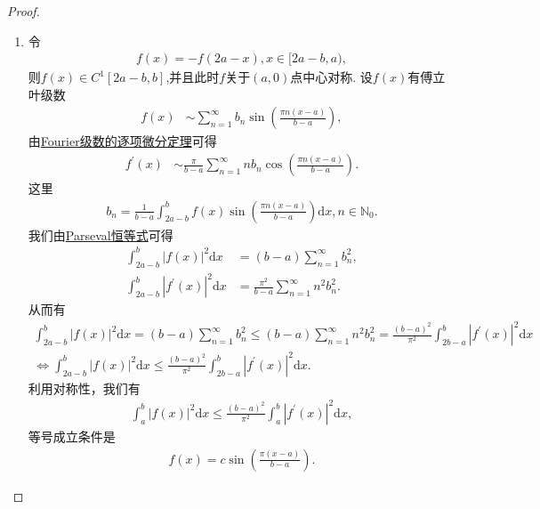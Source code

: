 \documentclass[../../main.tex]{subfiles}
\begin{document}
\begin{proof}
\begin{enumerate}[(1)]
\item 令
\begin{align*}
f(x)=-f(2a - x), x\in[2a - b,a),
\end{align*}
则$f(x)\in C^1[2a - b,b]$,并且此时$f$关于$(a,0)$点中心对称.
设$f(x)$有傅立叶级数
\begin{align*}
f(x) &\sim \sum_{n = 1}^{\infty}b_n\sin\left(\frac{\pi n(x - a)}{b - a}\right),
\end{align*}
由\hyperref[theorem:Fourier级数的逐项微分定理]{Fourier级数的逐项微分定理}可得
\begin{align*}
f^{\prime}(x) &\sim \frac{\pi}{b - a}\sum_{n = 1}^{\infty}nb_n\cos\left(\frac{\pi n(x - a)}{b - a}\right).
\end{align*}
这里
\begin{align*}
b_n=\frac{1}{b - a}\int_{2a - b}^{b}f(x)\sin\left(\frac{\pi n(x - a)}{b - a}\right)\mathrm{d}x, n\in\mathbb{N}_0.
\end{align*}
我们由\hyperref[theorem:Parseval恒等式]{Parseval恒等式}可得
\begin{align*}
\int_{2a - b}^{b}|f(x)|^2\mathrm{d}x&=(b - a)\sum_{n = 1}^{\infty}b_n^2,\\
\int_{2a - b}^{b}|f^{\prime}(x)|^2\mathrm{d}x&=\frac{\pi^2}{b - a}\sum_{n = 1}^{\infty}n^2b_n^2.
\end{align*}
从而有
\begin{gather*}
\int_{2a-b}^b{|f(x)|^2\mathrm{d}x}=\left( b-a \right) \sum_{n=1}^{\infty}{b_{n}^{2}}\leqslant \left( b-a \right) \sum_{n=1}^{\infty}{n^2b_{n}^{2}}=\frac{(b-a)^2}{\pi ^2}\int_{2b-a}^b{|f^{\prime}(x)|^2\mathrm{d}x}
\\
\Longleftrightarrow \int_{2a-b}^b{|f(x)|^2\mathrm{d}x}\leqslant \frac{(b-a)^2}{\pi ^2}\int_{2b-a}^b{|f^{\prime}(x)|^2\mathrm{d}x}.
\end{gather*}
利用对称性，我们有
\begin{align*}
\int_{a}^{b}|f(x)|^2\mathrm{d}x\leq\frac{(b - a)^2}{\pi^2}\int_{a}^{b}|f^{\prime}(x)|^2\mathrm{d}x,
\end{align*}
等号成立条件是
\begin{align*}
f(x)=c\sin\left(\frac{\pi(x - a)}{b - a}\right).
\end{align*} 
\end{enumerate}
\end{proof}
\end{document}
